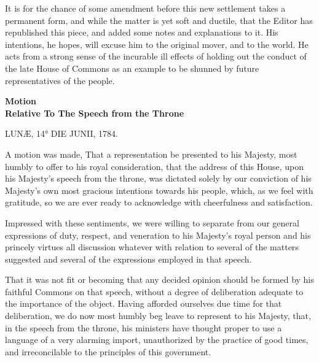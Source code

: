 It is for the chance of some amendment before this new settlement takes a permanent form, and while the matter is yet soft and ductile, that the Editor has republished this piece, and added some notes and explanations to it. His intentions, he hopes, will excuse him to the original mover, and to the world. He acts from a strong sense of the incurable ill effects of holding out the conduct of the late House of Commons as an example to be shunned by future representatives of the people.

\begin{center}
  \textbf{{\large Motion} \\Relative To {\large The Speech from the Throne}} \par 
\end{center}


\begin{center}
LUNÆ, 14° DIE JUNII, 1784.
\end{center}

A motion was made, That a representation be presented to his Majesty, most humbly to offer to his royal consideration, that the address of this House, upon his Majesty's speech from the throne, was dictated solely by our conviction of his Majesty's own most gracious intentions towards his people, which, as we feel with gratitude, so we are ever ready to acknowledge with cheerfulness and satisfaction.

Impressed with these sentiments, we were willing to separate from our general expressions of duty, respect, and veneration to his Majesty's royal person and his princely virtues all discussion whatever with relation to several of the matters suggested and several of the expressions employed in that speech.

That it was not fit or becoming that any decided opinion should be formed by his faithful Commons on that speech, without a degree of deliberation adequate to the importance of the object. Having afforded ourselves due time for that deliberation, we do now most humbly beg leave to represent to his Majesty, that, in the speech from the throne, his ministers have thought proper to use a language of a very alarming import, unauthorized by the practice of good times, and irreconcilable to the principles of this government.

